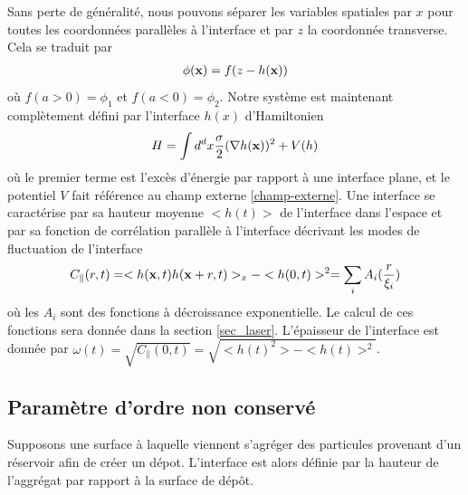 Sans perte de généralité, nous pouvons séparer les variables spatiales par $x$ pour toutes les coordonnées parallèles à l'interface et par $z$ la coordonnée transverse. Cela se traduit par
\begin{align}
    \phi({\bf x}) = f(z-h({\bf x}))
    \label{capillary-wave-theory}
\end{align}
où $f(a \greater 0) = \phi_1$ et $f(a \less 0) = \phi_2$. Notre système est maintenant complètement défini par l'interface $h(x)$ d'Hamiltonien
\begin{align}
    H = \int d^d x \frac{\sigma}{2} (\nabla h({\bf x}))^2 + V(h)
    \label{hamil-cwt}
\end{align}
où le premier terme est l'excès d'énergie par rapport à une interface plane, et le potentiel $V$ fait référence au champ externe \ref{champ-externe}. 
Une interface se caractérise par sa hauteur moyenne $<h(t)>$ de l'interface dans l'espace et par sa fonction de corrélation parallèle à l'interface décrivant les modes de fluctuation de l'interface
\begin{align}
    C_\parallel(r,t) = <h({\bf x},t)h({\bf x}+r,t)>_x - <h(0,t)>^2 = \sum_i A_i(\frac{r}{\xi_i}) 
\end{align}
où les $A_i$ sont des fonctions à décroissance exponentielle. Le calcul de ces fonctions sera donnée dans la section \ref{sec_laser}. 
L'épaisseur de l'interface est donnée par $\omega(t) = \sqrt{C_\parallel(0,t)} = \sqrt{<h(t)^2> - <h(t)>^2}$. 

    \subsection{Paramètre d'ordre non conservé}

Supposons une surface à laquelle viennent s'agréger des particules provenant d'un réservoir afin de créer un dépot. L'interface est alors définie par la hauteur de l'aggrégat par rapport à la surface de dépôt.

